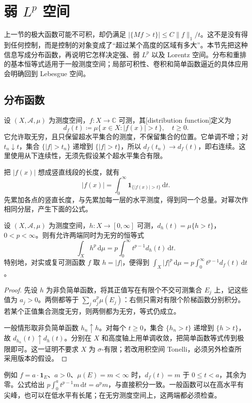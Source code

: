 \section{弱 \texorpdfstring{\(L^p\)}{Lᵖ} 空间}
\label{b2:sec:1702}

上一节的极大函数可能不可积，却仍满足 \(|\{Mf>t\}|\leq C\|f\|_1/t\)。这不是没有得到任何控制，而是控制的对象变成了“超过某个高度的区域有多大”。本节先把这种信息写成分布函数，再说明它怎样决定强、弱 \(L^p\) 以及 Lorentz 空间。分布和重排的基本恒等式适用于一般测度空间；局部可积性、卷积和简单函数逼近的具体应用会明确回到 Lebesgue 空间。

\subsection{分布函数}
\label{b2:subsec:170201}

设 \((X,\mathcal A,\mu)\) 为测度空间，\(f:X\to\mathbb C\) 可测，其[distribution function]定义为
\[d_f(t)\coloneqq\mu\{\,x\in X:|f(x)|>t\,\},\quad t\geq0.\]
它允许取无穷，且只保留超水平集合的测度，不保留集合的位置。它单调不增；对 \(t_n\downarrow t\)，集合 \(\{|f|>t_n\}\) 递增到 \(\{|f|>t\}\)，所以 \(d_f(t_n)\to d_f(t)\)，即右连续。这里使用从下连续性，无须先假设某个超水平集合有限。

\ProseParagraphBreak

把 \(|f(x)|\) 想成竖直线段的长度，就有
\[|f(x)|=\int_0^\infty\mathbf1_{\{|f(x)|>t\}}\,\mathrm dt.\]
先累加各点的竖直长度，与先累加每一层的水平测度，得到同一个总量。对幂次作相同分层，产生下面的公式。

\begin{proposition}[层蛋糕公式]\label{b2:thm:17-layer-cake}
设 \((X,\mathcal A,\mu)\) 为测度空间，\(h:X\to[0,\infty]\) 可测，\(d_h(t)=\mu\{h>t\}\)，\(0<p<\infty\)。则有允许两端同时为无穷的恒等式
\[\int_Xh^p\,\mathrm d\mu=p\int_0^\infty t^{p-1}d_h(t)\,\mathrm dt.\]
特别地，对实或复可测函数 \(f\) 取 \(h=|f|\)，便得到 \(\int_X|f|^p\,\mathrm d\mu=p\int_0^\infty t^{p-1}d_f(t)\,\mathrm dt\)。
\end{proposition}
\begin{proof}
先设 \(h\) 为非负简单函数，将其正值写在有限个不交可测集合 \(E_j\) 上，记这些值为 \(a_j>0\)。两侧都等于 \(\sum_j a_j^p\mu(E_j)\)：右侧只需对有限个阶梯函数分别积分。若某个正值集合测度无穷，则两侧都为无穷，等式仍成立。

一般情形取非负简单函数 \(h_n\uparrow h\)。对每个 \(t\geq0\)，集合 \(\{h_n>t\}\) 递增到 \(\{h>t\}\)，故 \(d_{h_n}(t)\uparrow d_h(t)\)。分别在 \(X\) 和高度轴上用单调收敛，把简单函数等式传到极限即可。这一证明不要求 \(X\) 为 \(\sigma\)-有限；若改用积空间 Tonelli，必须另外检查所采用版本的假设。
\end{proof}
例如 \(f=a\cdot\mathbf1_E\)、\(a>0\)、\(\mu(E)=m<\infty\) 时，\(d_f(t)=m\) 于 \(0\leq t<a\)，其余为零。公式给出 \(p\int_0^a t^{p-1}m\,\mathrm dt=a^pm\)，与直接积分一致。一般函数可以在高水平有尖峰，也可以在低水平有长尾；在无穷测度空间上，这两端都必须检查。

